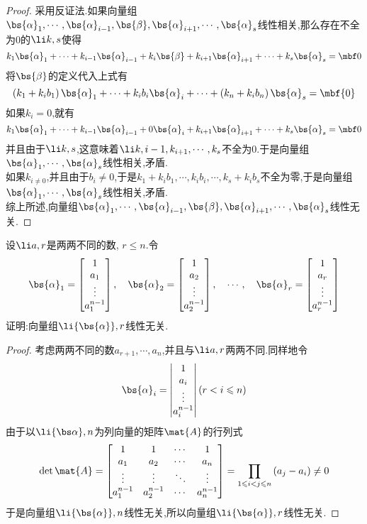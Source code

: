\documentclass{ctexart}
\begin{document}
\begin{proof}
    采用反证法.如果向量组$\bs{\alpha}_1,\cdots,\bs{\alpha}_{i-1},\bs{\beta},\bs{\alpha}_{i+1},\cdots,\bs{\alpha}_s$线性相关,那么存在不全为$0$的$\li k,s$使得
    \[k_1\bs{\alpha}_1+\cdots+k_{i-1}\bs{\alpha}_{i-1}+k_i\bs{\beta}+k_{i+1}\bs{\alpha}_{i+1}+\cdots+k_s\bs{\alpha}_s=\mbf0\]
    将$\bs{\beta}$的定义代入上式有
    \[\left(k_1+k_ib_1\right)\bs{\alpha}_1+\cdots+k_ib_i\bs{\alpha}_i+\cdots+\left(k_n+k_ib_n\right)\bs{\alpha}_s=\mbf{0}\]
    如果$k_i=0$,就有
    \[k_1\bs{\alpha}_1+\cdots+k_{i-1}\bs{\alpha}_{i-1}+0\bs{\alpha}_i+k_{i+1}\bs{\alpha}_{i+1}+\cdots+k_s\bs{\alpha}_s=\mbf0\]
    并且由于$\li k,s$,这意味着$\li k,{i-1},k_{i+1},\cdots,k_s$不全为$0$.于是向量组$\bs{\alpha}_1,\cdots,\bs{\alpha}_s$线性相关,矛盾.\\
    如果$k_{i\neq0}$,并且由于$b_i\neq0$,于是$k_1+k_ib_1,\cdots,k_ib_i,\cdots,k_s+k_ib_s$不全为零,于是向量组$\bs{\alpha}_1,\cdots,\bs{\alpha}_s$线性相关,矛盾.\\
    综上所述,向量组$\bs{\alpha}_1,\cdots,\bs{\alpha}_{i-1},\bs{\beta},\bs{\alpha}_{i+1},\cdots,\bs{\alpha}_s$线性无关.
\end{proof}
\begin{homework}[7]
    设$\li a,r$是两两不同的数, $r\leqslant n$.令
    \[\bs{\alpha}_1=\begin{bmatrix}
        1\\a_1\\\vdots\\a_1^{n-1}
    \end{bmatrix},\quad\bs{\alpha}_2=\begin{bmatrix}
        1\\a_2\\\vdots\\a_2^{n-1}
    \end{bmatrix},\quad\cdots,\quad\bs{\alpha}_r=\begin{bmatrix}
        1\\a_r\\\vdots\\a_r^{n-1}
    \end{bmatrix}\]
    证明:向量组$\li{\bs{\alpha}},r$线性无关.
\end{homework}
\begin{proof}
    考虑两两不同的数$a_{r+1},\cdots,a_n$,并且与$\li a,r$两两不同.同样地令
    \[\bs{\alpha}_i=\begin{vmatrix}
        1\\a_i\\\vdots\\a_i^{n-1}
    \end{vmatrix}(r<i\leqslant n)\]
    由于以$\li{\bs\alpha},n$为列向量的矩阵$\mat{A}$的行列式
    \[\det\mat{A}=\begin{bmatrix}
        1&1&\cdots&1\\
        a_1&a_2&\cdots&a_n\\
        \vdots&\vdots&\ddots&\vdots\\
        a_1^{n-1}&a_2^{n-1}&\cdots&a_n^{n-1}
    \end{bmatrix}=\prod_{1\leqslant i<j\leqslant n}\left(a_j-a_i\right)\neq0\]
    于是向量组$\li{\bs{\alpha}},n$线性无关,所以向量组$\li{\bs{\alpha}},r$线性无关.
\end{proof}
\end{document}
